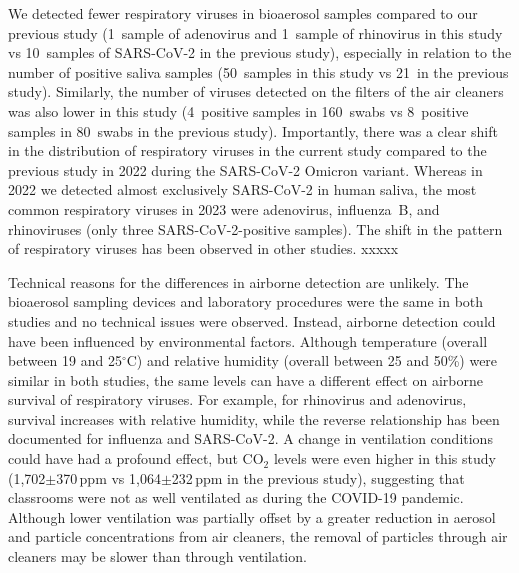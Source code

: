\documentclass[fleqn,11pt]{wlscirep}
\begin{document}

We detected fewer respiratory viruses in bioaerosol samples compared to our previous study\cite{Banholzer2023PLoSMed} (1~sample of adenovirus and 1~sample of rhinovirus in this study vs 10~samples of SARS-CoV-2 in the previous study), especially in relation to the number of positive saliva samples (50~samples in this study vs 21~in the previous study). Similarly, the number of viruses detected on the filters of the air cleaners was also lower in this study (4~positive samples in 160~swabs vs 8~positive samples in 80~swabs in the previous study). Importantly, there was a clear shift in the distribution of respiratory viruses in the current study compared to the previous study in 2022 during the SARS-CoV-2 Omicron variant. Whereas in 2022 we detected almost exclusively SARS-CoV-2 in human saliva, the most common respiratory viruses in 2023 were adenovirus, influenza~B, and rhinoviruses (only three SARS-CoV-2-positive samples). The shift in the pattern of respiratory viruses has been observed in other studies\cite{Nygaard2023Lancet,Sauteur2022EuroSurv}. xxxxx


Technical reasons for the differences in airborne detection are unlikely. The bioaerosol sampling devices and laboratory procedures were the same in both studies and no technical issues were observed. Instead, airborne detection could have been influenced by environmental factors. Although temperature (overall between 19 and 25$^{\circ}$C) and relative humidity (overall between 25 and 50\%) were similar in both studies, the same levels can have a different effect on airborne survival of respiratory viruses. For example, for rhinovirus and adenovirus, survival increases with relative humidity, while the reverse relationship has been documented for influenza and SARS-CoV-2\cite{Tellier2009JTRSI,Ahlawat2020AAQR,Biryukov2020mS,Karim1985CJM,Davis1971AM}. A change in ventilation conditions could have had a profound effect, but CO$_2$ levels were even higher in this study (1,702$\pm$370\,ppm vs 1,064$\pm$232\,ppm in the previous study), suggesting that classrooms were not as well ventilated as during the COVID-19 pandemic. Although lower ventilation was partially offset by a greater reduction in aerosol and particle concentrations from air cleaners, the removal of particles through air cleaners may be slower than through ventilation.

\end{document}
